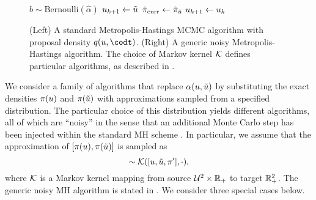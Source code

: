 \documentclass[12pt]{article}
\begin{document}
\begin{figure}[ht]
\begin{minipage}[t]{0.495\textwidth}
\begin{algorithmic}[1]
            \State $b \sim \text{Bernoulli}(\hat{\alpha})$
                \State $u_{k+1} \gets \tilde{u}$
                \State $\hat{\pi}_{\text{curr}} \gets \hat{\pi}_{\tilde{u}}$
            \Else
                \State $u_{k+1} \gets u_k$
            \EndIf
        \EndFor
    \EndFunction
    \end{algorithmic}
\end{minipage}
\caption{(Left) A standard Metropolis-Hastings MCMC algorithm with proposal density $\propDens(\Par, \codt)$.
(Right) A generic noisy Metropolis-Hastings algorithm. The choice of Markov kernel $\mathcal{K}$ 
defines particular algorithms, as described in .}
\end{figure}

We consider a family of algorithms that replace $\alpha(u, \tilde{u})$ by
substituting the exact densities $\pi(u)$  and $\pi(\tilde{u})$ 
with approximations sampled from a specified distribution. The particular choice of 
this distribution yields different algorithms, all of which are ``noisy'' in the sense that 
an additional Monte Carlo step has been injected within the standard MH scheme
\citep{noisyMCSurvey,noisyMCMC,stabilityNoisyMH}. In particular, we assume 
that the approximation of $[\pi(u), \pi(\tilde{u})]$ is sampled as
\begin{equation}
[\hat{\postDens}_{\Par}, \hat{\postDens}_{\propPar}] \sim \postSampleKernel([\Par, \propPar, \postDens^\prime], \cdot),
\end{equation}
where $\mathcal{K}$ is a Markov kernel mapping from source $\mathcal{U}^2 \times \mathbb{R}_+$
to target $\mathbb{R}^2_{+}$. The generic noisy MH algorithm is stated in . 
We consider three special cases below.
\end{document}
